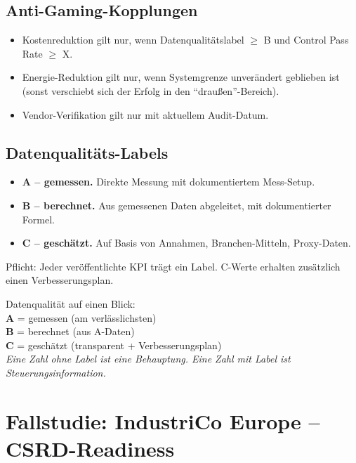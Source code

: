 \documentclass[11pt,a4paper,oneside]{article}
\newcommand{\caveatfontfallback}{\itshape}
\newcommand\caveatfont{\caveatfontfallback}%
\newcommand{\akzent}[1]{{\caveatfont\color{lpAmber}#1}}
\begin{document}
\subsection{Anti-Gaming-Kopplungen}

\begin{itemize}
  \item Kostenreduktion gilt nur, wenn Datenqualitätslabel $\geq$ B und Control Pass Rate $\geq$ X.
  \item Energie-Reduktion gilt nur, wenn Systemgrenze unverändert geblieben ist (sonst verschiebt sich der Erfolg in den ``draußen''-Bereich).
  \item Vendor-Verifikation gilt nur mit aktuellem Audit-Datum.
\end{itemize}

\subsection{Datenqualitäts-Labels}

\begin{itemize}
  \item \textbf{A -- gemessen.} Direkte Messung mit dokumentiertem Mess-Setup.
  \item \textbf{B -- berechnet.} Aus gemessenen Daten abgeleitet, mit dokumentierter Formel.
  \item \textbf{C -- geschätzt.} Auf Basis von Annahmen, Branchen-Mitteln, Proxy-Daten.
\end{itemize}

Pflicht: Jeder veröffentlichte KPI trägt ein Label. C-Werte erhalten zusätzlich einen Verbesserungsplan.

\begin{eselsbox}[Eselsbrücke: \akzent{A-B-C}]
Datenqualität auf einen Blick:\\[2pt]
\textbf{A} = gemessen (am verlässlichsten)\\
\textbf{B} = berechnet (aus A-Daten)\\
\textbf{C} = geschätzt (transparent + Verbesserungsplan)\\[2pt]
\emph{Eine Zahl ohne Label ist eine Behauptung. Eine Zahl mit Label ist Steuerungsinformation.}
\end{eselsbox}

\section{Fallstudie: IndustriCo Europe -- CSRD-Readiness}
\end{document}
